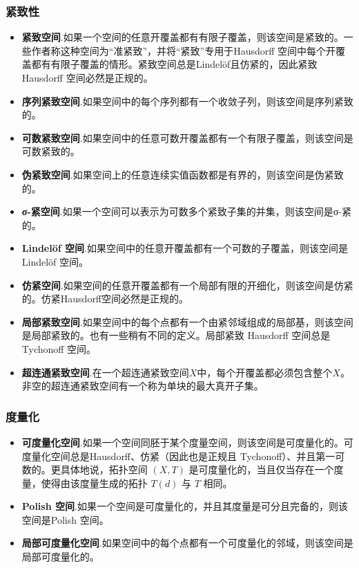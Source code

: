 \subsubsection{紧致性}
\begin{itemize}
\item \textbf{紧致空间}.如果一个空间的任意开覆盖都有有限子覆盖，则该空间是紧致的。一些作者称这种空间为“准紧致”，并将“紧致”专用于Hausdorff 空间中每个开覆盖都有有限子覆盖的情形。紧致空间总是Lindelöf且仿紧的，因此紧致 Hausdorff 空间必然是正规的。
\item \textbf{序列紧致空间}.如果空间中的每个序列都有一个收敛子列，则该空间是序列紧致的。
\item \textbf{可数紧致空间}.如果空间中的任意可数开覆盖都有一个有限子覆盖，则该空间是可数紧致的。
\item \textbf{伪紧致空间}.如果空间上的任意连续实值函数都是有界的，则该空间是伪紧致的。
\item \textbf{σ-紧空间}.如果一个空间可以表示为可数多个紧致子集的并集，则该空间是σ-紧的。
\item \textbf{Lindelöf 空间}.如果空间中的任意开覆盖都有一个可数的子覆盖，则该空间是Lindelöf 空间。
\item \textbf{仿紧空间}.如果空间的任意开覆盖都有一个局部有限的开细化，则该空间是仿紧的。仿紧Hausdorff空间必然是正规的。
\item \textbf{局部紧致空间}.如果空间中的每个点都有一个由紧邻域组成的局部基，则该空间是局部紧致的。也有一些稍有不同的定义。局部紧致 Hausdorff 空间总是 Tychonoff 空间。
\item \textbf{超连通紧致空间}.在一个超连通紧致空间$X$中，每个开覆盖都必须包含整个$X$。非空的超连通紧致空间有一个称为单块的最大真开子集。
\end{itemize}
\subsubsection{度量化}
\begin{itemize}
\item \textbf{可度量化空间}.如果一个空间同胚于某个度量空间，则该空间是可度量化的。可度量化空间总是Hausdorff、仿紧（因此也是正规且 Tychonoff）、并且第一可数的。更具体地说，拓扑空间 $(X, T)$ 是可度量化的，当且仅当存在一个度量，使得由该度量生成的拓扑 $T(d)$ 与 $T$ 相同。
\item \textbf{Polish 空间}.如果一个空间是可度量化的，并且其度量是可分且完备的，则该空间是Polish 空间。
\item \textbf{局部可度量化空间}.如果空间中的每个点都有一个可度量化的邻域，则该空间是局部可度量化的。
\end{itemize}
